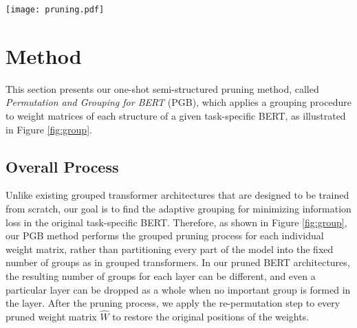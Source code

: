 \begin{figure*}[t!]
    \centering
    {\texttt{[image: pruning.pdf]}}
    \caption{The grouping procedure of PGB for weight matrices in BERT, which applies to both MHA and FFN layers}
    \label{fig:group}
\end{figure*}


\section{Method} \label{sec:method}
This section presents our one-shot semi-structured pruning method, called \textit{Permutation and Grouping for BERT} (PGB), which applies a grouping procedure to weight matrices of each structure of a given task-specific BERT, as illustrated in Figure \ref{fig:group}.

\subsection{Overall Process} \label{sec:overall}
Unlike existing grouped transformer architectures \cite{GroupFormer,groupbert} that are designed to be trained from scratch, our goal is to find the adaptive grouping for minimizing information loss in the original task-specific BERT. Therefore, as shown in Figure \ref{fig:group}, our PGB method performs the grouped pruning process for each individual weight matrix, rather than partitioning every part of the model into the fixed number of groups as in grouped transformers. In our pruned BERT architectures, the resulting number of groups for each layer can be different, and even a particular layer can be dropped as a whole when no important group is formed in the layer. After the pruning process, we apply the re-permutation step to every pruned weight matrix $\hat{W}$ to restore the original positions of the weights.

